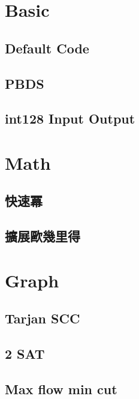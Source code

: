 \section{Basic}
\subsection{Default Code}

\subsection{PBDS}

\subsection{int128 Input Output}


\section{Math}
\subsection{快速冪} 

\subsection{擴展歐幾里得} 


\section{Graph}
\subsection{Tarjan SCC} 

\subsection{2 SAT} 

% 
\subsection{Max flow min cut} 


